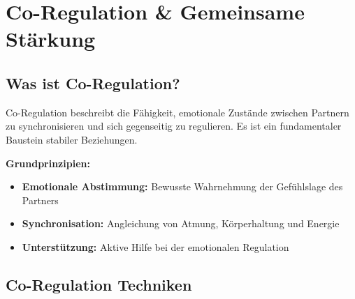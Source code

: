 
\section{Co-Regulation \& Gemeinsame Stärkung}
\label{sec:co-regulation}

\begin{ctmmBlueBox}[title=Tool 26: Co-Regulation System]

\subsection{Was ist Co-Regulation?}

Co-Regulation beschreibt die Fähigkeit, emotionale Zustände zwischen Partnern zu synchronisieren und sich gegenseitig zu regulieren. Es ist ein fundamentaler Baustein stabiler Beziehungen.

\vspace{0.5em}

\textbf{Grundprinzipien:}
\begin{itemize}
    \item \textcolor{ctmmBlue}{\textbf{Emotionale Abstimmung:}} Bewusste Wahrnehmung der Gefühlslage des Partners
    \item \textcolor{ctmmGreen}{\textbf{Synchronisation:}} Angleichung von Atmung, Körperhaltung und Energie
    \item \textcolor{ctmmOrange}{\textbf{Unterstützung:}} Aktive Hilfe bei der emotionalen Regulation
\end{itemize}

\end{ctmmBlueBox}

\subsection{Co-Regulation Techniken}

